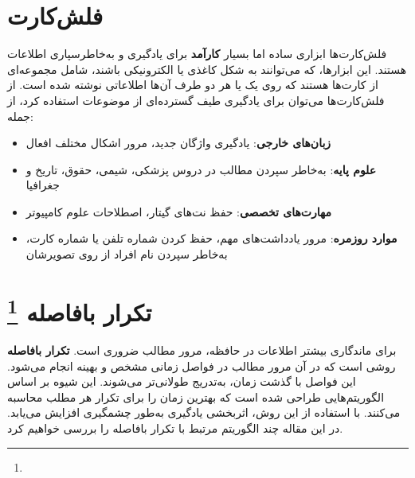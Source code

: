 \documentclass[12pt]{report}
\begin{document}
\section{فلش‌کارت}
فلش‌کارت‌ها ابزاری ساده اما بسیار 
\textbf{کارآمد}
برای یادگیری و به‌خاطرسپاری اطلاعات هستند. این ابزارها، که می‌توانند به شکل 
کاغذی یا الکترونیکی باشند، شامل مجموعه‌ای از کارت‌ها هستند
 که روی یک یا هر دو طرف آن‌ها اطلاعاتی نوشته شده است. از فلش‌کارت‌ها 
می‌توان برای یادگیری طیف گسترده‌ای از موضوعات استفاده کرد، از جمله:

\begin{itemize}
  \item \textbf{زبان‌های خارجی}: یادگیری واژگان جدید، مرور اشکال مختلف افعال
  \item \textbf{علوم پایه}: به‌خاطر سپردن مطالب در دروس پزشکی، شیمی، حقوق، تاریخ و جغرافیا
  \item \textbf{مهارت‌های تخصصی}: حفظ نت‌های گیتار، اصطلاحات علوم کامپیوتر
  \item \textbf{موارد روزمره}: مرور یادداشت‌های مهم، حفظ کردن شماره تلفن یا شماره کارت، به‌خاطر سپردن نام افراد از روی تصویرشان
\end{itemize}

\section{تکرار بافاصله
\protect\footnote{}
}

برای ماندگاری بیشتر اطلاعات در حافظه، مرور مطالب ضروری است.
\textbf{تکرار بافاصله}
 روشی است که در آن مرور مطالب در فواصل زمانی مشخص و بهینه انجام می‌شود.
  این فواصل با گذشت زمان،
  به‌تدریج طولانی‌تر می‌شوند. 
 این شیوه بر اساس الگوریتم‌هایی 
 طراحی شده است که بهترین زمان را
  برای تکرار هر مطلب محاسبه می‌کنند. 
 با استفاده از این روش، اثربخشی
  یادگیری به‌طور چشمگیری افزایش می‌یابد. 
 در این مقاله چند الگوریتم مرتبط
  با تکرار بافاصله را 
 بررسی خواهیم کرد.

\end{document}
